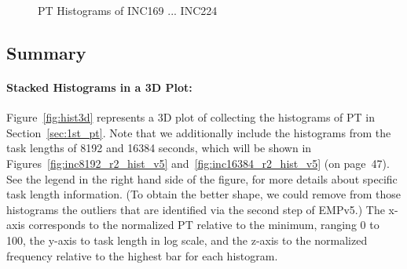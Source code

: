 \begin{figure}[hp!]
{		\label{fig:inc192_pt_hist}
	}
	\caption{PT Histograms of INC169 ... INC224~\label{fig:new_pt_hist4}}
\end{figure}

\pagebreak
\newpage

\subsection{Summary}

\paragraph{Stacked Histograms in a 3D Plot:}
Figure~\ref{fig:hist3d} represents a 3D plot of collecting the histograms of PT in Section~\ref{sec:1st_pt}. 
Note that we additionally include the histograms from the task lengths of 8192 and 16384 seconds, which will be shown in Figures~\ref{fig:inc8192_r2_hist_v5} and~\ref{fig:inc16384_r2_hist_v5} (on page~47). See the legend in the right hand side of the figure, for more details about specific task length information. 
(To obtain the better shape, we could remove from those histograms the outliers that are identified via the second step of EMPv5.)
The x-axis corresponds to the normalized PT relative to the minimum, ranging 0 to 100, the y-axis to task length in log scale, and the z-axis to the normalized frequency relative to the highest bar for each histogram.

